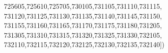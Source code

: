 \documentclass[
  12,
  dvipsnames]{article}
\newenvironment{Shaded}{\begin{snugshade}}{\end{snugshade}}
\newcommand{\NormalTok}[1]{#1}
\newcommand{\StringTok}[1]{\textcolor[rgb]{0.31,0.60,0.02}{#1}}
\begin{document}
\begin{Shaded}
\begin{Highlighting}[]
                  \StringTok{\textquotesingle{}725605\textquotesingle{}}\NormalTok{,}\StringTok{\textquotesingle{}725610\textquotesingle{}}\NormalTok{,}\StringTok{\textquotesingle{}725705\textquotesingle{}}\NormalTok{,}\StringTok{\textquotesingle{}730105\textquotesingle{}}\NormalTok{,}\StringTok{\textquotesingle{}731105\textquotesingle{}}\NormalTok{,}\StringTok{\textquotesingle{}731110\textquotesingle{}}\NormalTok{,}\StringTok{\textquotesingle{}731115\textquotesingle{}}\NormalTok{,}
                  \StringTok{\textquotesingle{}731120\textquotesingle{}}\NormalTok{,}\StringTok{\textquotesingle{}731125\textquotesingle{}}\NormalTok{,}\StringTok{\textquotesingle{}731130\textquotesingle{}}\NormalTok{,}\StringTok{\textquotesingle{}731135\textquotesingle{}}\NormalTok{,}\StringTok{\textquotesingle{}731140\textquotesingle{}}\NormalTok{,}\StringTok{\textquotesingle{}731145\textquotesingle{}}\NormalTok{,}\StringTok{\textquotesingle{}731150\textquotesingle{}}\NormalTok{,}
                  \StringTok{\textquotesingle{}731155\textquotesingle{}}\NormalTok{,}\StringTok{\textquotesingle{}731160\textquotesingle{}}\NormalTok{,}\StringTok{\textquotesingle{}731165\textquotesingle{}}\NormalTok{,}\StringTok{\textquotesingle{}731170\textquotesingle{}}\NormalTok{,}\StringTok{\textquotesingle{}731175\textquotesingle{}}\NormalTok{,}\StringTok{\textquotesingle{}731180\textquotesingle{}}\NormalTok{,}\StringTok{\textquotesingle{}731205\textquotesingle{}}\NormalTok{,}
                  \StringTok{\textquotesingle{}731305\textquotesingle{}}\NormalTok{,}\StringTok{\textquotesingle{}731310\textquotesingle{}}\NormalTok{,}\StringTok{\textquotesingle{}731315\textquotesingle{}}\NormalTok{,}\StringTok{\textquotesingle{}731320\textquotesingle{}}\NormalTok{,}\StringTok{\textquotesingle{}731325\textquotesingle{}}\NormalTok{,}\StringTok{\textquotesingle{}731330\textquotesingle{}}\NormalTok{,}\StringTok{\textquotesingle{}732105\textquotesingle{}}\NormalTok{,}
                  \StringTok{\textquotesingle{}732110\textquotesingle{}}\NormalTok{,}\StringTok{\textquotesingle{}732115\textquotesingle{}}\NormalTok{,}\StringTok{\textquotesingle{}732120\textquotesingle{}}\NormalTok{,}\StringTok{\textquotesingle{}732125\textquotesingle{}}\NormalTok{,}\StringTok{\textquotesingle{}732130\textquotesingle{}}\NormalTok{,}\StringTok{\textquotesingle{}732135\textquotesingle{}}\NormalTok{,}\StringTok{\textquotesingle{}732140\textquotesingle{}}\NormalTok{])}


\end{Highlighting}
\end{Shaded}
\end{document}
